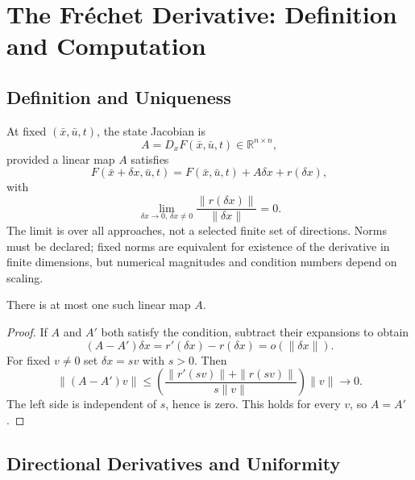 \section{The Fréchet Derivative: Definition and Computation}

\subsection{Definition and Uniqueness}

At fixed $(\bar x,\bar u,t)$, the state Jacobian is
\begin{equation}
A=D_xF(\bar x,\bar u,t)\in\mathbb R^{n\times n},
\label{eq:ch1:jacobian-A}
\end{equation}
provided a linear map $A$ satisfies
\begin{equation}
F(\bar x+\delta x,\bar u,t)=F(\bar x,\bar u,t)+A\delta x+r(\delta x),
\label{eq:ch1:frechet}
\end{equation}
with
\begin{equation}
\lim_{\delta x\to0,\,\delta x\ne0}\frac{\|r(\delta x)\|}{\|\delta x\|}=0.
\label{eq:ch1:frechet-limit}
\end{equation}
The limit is over all approaches, not a selected finite set of directions. Norms must be
declared; fixed norms are equivalent for existence of the derivative in finite dimensions,
but numerical magnitudes and condition numbers depend on scaling.

\begin{proposition}\label{prop:frechet-unique}
There is at most one such linear map $A$.
\end{proposition}
\begin{proof}
If $A$ and $A'$ both satisfy the condition, subtract their expansions to obtain
\begin{equation}
(A-A')\delta x=r'(\delta x)-r(\delta x)=o(\|\delta x\|).
\label{eq:ch1:diff-matrices}
\end{equation}
For fixed $v\ne0$ set $\delta x=sv$ with $s>0$. Then
\[
\|(A-A')v\|\leq
\left(\frac{\|r'(sv)\|+\|r(sv)\|}{s\|v\|}\right)\|v\|\longrightarrow0.
\]
The left side is independent of $s$, hence is zero. This holds for every $v$, so $A=A'$.
\end{proof}

\subsection{Directional Derivatives and Uniformity}

